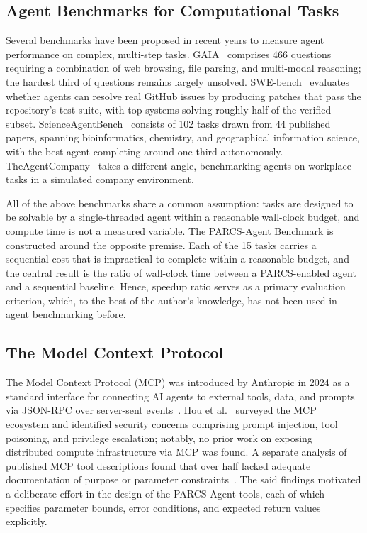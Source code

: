 \documentclass[preprints,article,submit,pdftex,moreauthors]{Definitions/mdpi}
\begin{document}
\subsection{Agent Benchmarks for Computational Tasks}

Several benchmarks have been proposed in recent years to measure agent performance on complex, multi-step tasks. GAIA~\citep{ref-gaia} comprises 466 questions requiring a combination of web browsing, file parsing, and multi-modal reasoning; the hardest third of questions remains largely unsolved. SWE-bench~\citep{ref-swebench} evaluates whether agents can resolve real GitHub issues by producing patches that pass the repository's test suite, with top systems solving roughly half of the verified subset. ScienceAgentBench~\citep{ref-sciagentbench} consists of 102 tasks drawn from 44 published papers, spanning bioinformatics, chemistry, and geographical information science, with the best agent completing around one-third autonomously. TheAgentCompany~\citep{ref-agentcompany} takes a different angle, benchmarking agents on workplace tasks in a simulated company environment.

All of the above benchmarks share a common assumption: tasks are designed to be solvable by a single-threaded agent within a reasonable wall-clock budget, and compute time is not a measured variable. The PARCS-Agent Benchmark is constructed around the opposite premise. Each of the 15 tasks carries a sequential cost that is impractical to complete within a reasonable budget, and the central result is the ratio of wall-clock time between a PARCS-enabled agent and a sequential baseline. Hence, speedup ratio serves as a primary evaluation criterion, which, to the best of the author's knowledge, has not been used in agent benchmarking before.

\subsection{The Model Context Protocol}

The Model Context Protocol (MCP) was introduced by Anthropic in 2024 as a standard interface for connecting AI agents to external tools, data, and prompts via JSON-RPC over server-sent events~\citep{ref-mcp}. Hou et al.~\citep{ref-mcpsurvey} surveyed the MCP ecosystem and identified security concerns comprising prompt injection, tool poisoning, and privilege escalation; notably, no prior work on exposing distributed compute infrastructure via MCP was found. A separate analysis of published MCP tool descriptions found that over half lacked adequate documentation of purpose or parameter constraints~\citep{ref-mcpsmell}. The said findings motivated a deliberate effort in the design of the PARCS-Agent tools, each of which specifies parameter bounds, error conditions, and expected return values explicitly.
\end{document}

